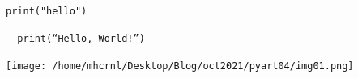 \documentclass[12pt,a4paper]{book}
\begin{document}
\begin{lstlisting}
print("hello")
\end{lstlisting}




    
\begin{verbatim}
  print(“Hello, World!”) 
\end{verbatim} 


   

	



  \texttt{[image: /home/mhcrnl/Desktop/Blog/oct2021/pyart04/img01.png]}
  
 
\end{document}
